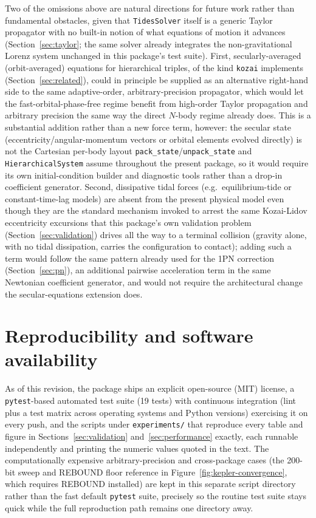 \documentclass[11pt]{article}
\begin{document}
Two of the omissions above are natural directions for future work rather
than fundamental obstacles, given that \texttt{TidesSolver} itself is a
generic Taylor propagator with no built-in notion of what equations of
motion it advances (Section~\ref{sec:taylor}; the same solver already
integrates the non-gravitational Lorenz system unchanged in this package's
test suite). First, secularly-averaged (orbit-averaged) equations for
hierarchical triples, of the kind \texttt{kozai} implements
(Section~\ref{sec:related}), could in principle be supplied as an
alternative right-hand side to the same adaptive-order, arbitrary-precision
propagator, which would let the fast-orbital-phase-free regime benefit from
high-order Taylor propagation and arbitrary precision the same way the
direct $N$-body regime already does. This is a substantial addition rather
than a new force term, however: the secular state (eccentricity/angular-momentum
vectors or orbital elements evolved directly) is not the Cartesian
per-body layout \texttt{pack\_state}/\texttt{unpack\_state} and
\texttt{HierarchicalSystem} assume throughout the present package, so it
would require its own initial-condition builder and diagnostic tools rather
than a drop-in coefficient generator. Second, dissipative tidal forces
(e.g.\ equilibrium-tide or constant-time-lag models) are absent from the
present physical model even though they are the standard mechanism invoked
to arrest the same Kozai-Lidov eccentricity excursions that this package's
own validation problem (Section~\ref{sec:validation}) drives all the way to
a terminal collision (gravity alone, with no tidal dissipation, carries the
configuration to contact); adding such a term would follow the same pattern
already used for the 1PN correction (Section~\ref{sec:pn}), an additional
pairwise acceleration term in the same Newtonian coefficient generator, and
would not require the architectural change the secular-equations extension
does.


\section{Reproducibility and software availability}
\label{sec:availability}

As of this revision, the package ships an explicit open-source (MIT)
license, a \texttt{pytest}-based automated test suite (19 tests) with
continuous integration (lint plus a test matrix across operating systems
and Python versions) exercising it on every push, and the scripts under
\texttt{experiments/} that reproduce every table and figure in
Sections~\ref{sec:validation} and~\ref{sec:performance} exactly, each
runnable independently and printing the numeric values quoted in the text.
The computationally expensive arbitrary-precision and cross-package cases
(the 200-bit sweep and REBOUND floor reference in
Figure~\ref{fig:kepler-convergence}, which requires REBOUND installed) are
kept in this separate script directory rather than the fast default
\texttt{pytest} suite, precisely so the routine test suite stays quick
while the full reproduction path remains one directory away.
\end{document}

